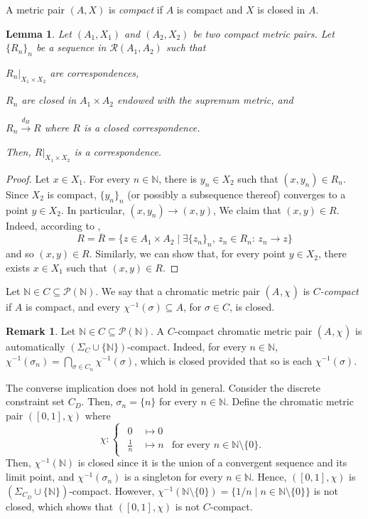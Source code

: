 \documentclass[8pt,a4paper,oneside,english,english]{article}
\theoremstyle{plain}
\theoremstyle
{plain}
\newtheorem{lemma}[theorem]{Lemma}%
\theoremstyle{definition}
\newtheorem{remark}[theorem]{Remark}%
\newcommand{\N}{\mathbb{N}}
\newcommand{\MP}[1]{(A_{#1},\chi_{#1})}
\begin{document}
A metric pair $(A,X)$ is {\em compact} if $A$ is compact and $X$ is closed in $A$.

\begin{lemma}\label{lemma:pair_correspondences_converge_to_pair_correspondences}
    Let $(A_1,X_1)$ and $(A_2,X_2)$ be two compact metric pairs. Let $\{R_n\}_n$ be a sequence in $\mathcal R(A_1,A_2)$ such that 
    \begin{compactenum}[(i)]
        \item $R_n|_{X_1\times X_2}$ are correspondences,
        \item $R_n$ are closed in $A_1\times A_2$ endowed with the supremum metric, and 
        \item $R_n\xrightarrow{d_H}R$ where $R$ is a closed correspondence.
    \end{compactenum}
    Then, $R|_{X_1\times X_2}$ is a correspondence.
\end{lemma}
\begin{proof}
    Let $x\in X_1$. For every $n\in\N$, there is $y_n\in X_2$ such that $(x,y_n)\in R_n$. Since $X_2$ is compact, $\{y_n\}_n$ (or possibly a subsequence thereof) converges to a point $y\in X_2$. In particular, $(x,y_n)\to(x,y)$, We claim that $(x,y)\in R$. Indeed, according to \cite[Propositions 5.18, 5.20]{Tuz}, 
    \[
    R=\overline R=\{z\in A_1\times A_2\mid \exists\{z_n\}_n,\, z_n\in R_n:\, z_n\to z\}
    \]
    and so $(x,y)\in R$. Similarly, we can show that, for every point $y\in X_2$, there exists $x\in X_1$ such that $(x,y)\in R$.
\end{proof}

Let $\N\in C\subseteq\mathcal P(\N)$. We say that a chromatic metric pair $\MP{}$ is {\em $C$-compact} if $A$ is compact, and every $\chi^{-1}(\sigma)\subseteq A$, for $\sigma\in C$, is closed. 

\begin{remark}\label{rem:C_and_Sigma_C_compact}
Let $\N\in C\subseteq\mathcal P(\N)$. A $C$-compact chromatic metric pair $\MP{}$ is automatically $(\Sigma_C\cup\{\N\})$-compact. Indeed, for every $n\in\N$, $\chi^{-1}(\sigma_n)=\bigcap_{\sigma\in C_n}\chi^{-1}(\sigma)$, which is closed provided that so is each $\chi^{-1}(\sigma)$.

The converse implication does not hold in general. Consider the discrete constraint set $C_D$. Then, $\sigma_n=\{n\}$ for every $n\in\N$. Define the chromatic metric pair $([0,1],\chi)$ where
\[
\chi\colon\begin{cases}
    \begin{aligned}
        0\,&\mapsto 0 &\\
        \frac{1}{n}\,&\mapsto n &\text{for every $n\in\N\setminus\{0\}$.}
    \end{aligned}
\end{cases}
\]
Then, $\chi^{-1}(\N)$ is closed since it is the union of a convergent sequence and its limit point, and $\chi^{-1}(\sigma_n)$ is a singleton for every $n\in\N$. Hence, $([0,1], \chi)$ is $(\Sigma_{C_D}\cup\{\N\})$-compact. However, $\chi^{-1}(\N\setminus\{0\})=\{1/n\mid n\in\N\setminus\{0\}\}$ is not closed, which shows that $([0,1],\chi)$ is not $C$-compact.
\end{remark}
\end{document}

